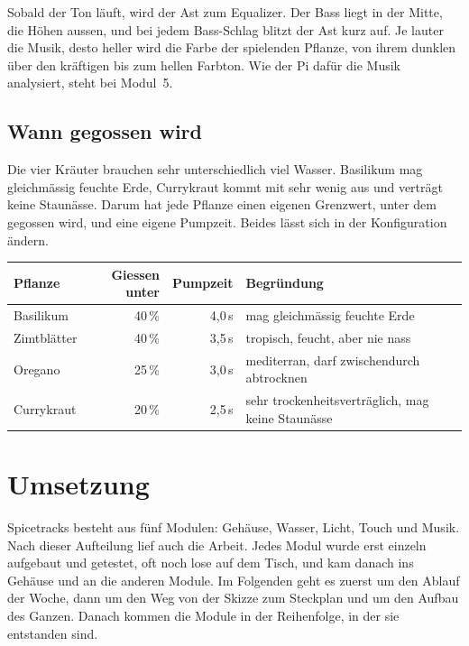 \documentclass[11pt,a4paper]{article}
\begin{document}
Sobald der Ton läuft, wird der Ast zum Equalizer. Der Bass liegt in der Mitte, die Höhen aussen, und bei jedem Bass-Schlag blitzt der Ast kurz auf. Je lauter die Musik, desto heller wird die Farbe der spielenden Pflanze, von ihrem dunklen über den kräftigen bis zum hellen Farbton. Wie der Pi dafür die Musik analysiert, steht bei Modul~5.

\subsection{Wann gegossen wird}

Die vier Kräuter brauchen sehr unterschiedlich viel Wasser. Basilikum mag gleichmässig feuchte Erde, Currykraut kommt mit sehr wenig aus und verträgt keine Staunässe. Darum hat jede Pflanze einen eigenen Grenzwert, unter dem gegossen wird, und eine eigene Pumpzeit. Beides lässt sich in der Konfiguration ändern.

\begin{table}[H]
\centering
\begin{tabularx}{\linewidth}{lrrL}
\toprule
\textbf{Pflanze} & \textbf{Giessen unter} & \textbf{Pumpzeit} & \textbf{Begründung} \\
\midrule
Basilikum & 40\,\% & 4,0\,s & mag gleichmässig feuchte Erde \\
Zimtblätter & 40\,\% & 3,5\,s & tropisch, feucht, aber nie nass \\
Oregano & 25\,\% & 3,0\,s & mediterran, darf zwischendurch abtrocknen \\
Currykraut & 20\,\% & 2,5\,s & sehr trockenheitsverträglich, mag keine Staunässe \\
\bottomrule
\end{tabularx}
\end{table}

\section{Umsetzung}

Spicetracks besteht aus fünf Modulen: Gehäuse, Wasser, Licht, Touch und Musik. Nach dieser Aufteilung lief auch die Arbeit. Jedes Modul wurde erst einzeln aufgebaut und getestet, oft noch lose auf dem Tisch, und kam danach ins Gehäuse und an die anderen Module. Im Folgenden geht es zuerst um den Ablauf der Woche, dann um den Weg von der Skizze zum Steckplan und um den Aufbau des Ganzen. Danach kommen die Module in der Reihenfolge, in der sie entstanden sind.
\end{document}
